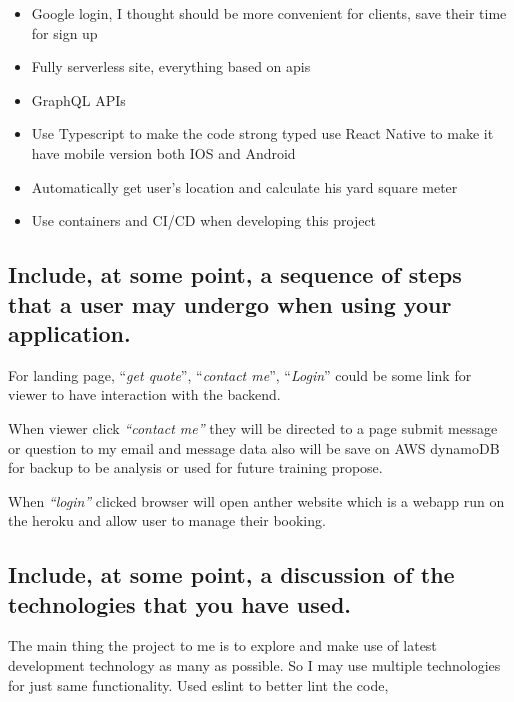 \documentclass[
  paper=a4,
  ,captions=tableheading
]{scrartcl}
\providecommand{\tightlist}{%
  \setlength{\itemsep}{0pt}\setlength{\parskip}{0pt}}
\begin{document}
\begin{itemize}
\tightlist
\item
  Google login, I thought should be more convenient for clients, save
  their time for sign up
\item
  Fully serverless site, everything based on apis
\item
  GraphQL APIs
\item
  Use Typescript to make the code strong typed use React Native to make
  it have mobile version both IOS and Android
\item
  Automatically get user's location and calculate his yard square meter
\item
  Use containers and CI/CD when developing this project
\end{itemize}

\hypertarget{include-at-some-point-a-sequence-of-steps-that-a-user-may-undergo-when-using-your-application.}{%
\subsection{Include, at some point, a sequence of steps that a user may
undergo when using your
application.}\label{include-at-some-point-a-sequence-of-steps-that-a-user-may-undergo-when-using-your-application.}}

For landing page, \enquote{\emph{get quote}}, \enquote{\emph{contact
me}}, \enquote{\emph{Login}} could be some link for viewer to have
interaction with the backend.

When viewer click \emph{\enquote{contact me}} they will be directed to a
page submit message or question to my email and message data also will
be save on AWS dynamoDB for backup to be analysis or used for future
training propose.

When \emph{\enquote{login}} clicked browser will open anther website
which is a webapp run on the heroku and allow user to manage their
booking.

\hypertarget{include-at-some-point-a-discussion-of-the-technologies-that-you-have-used.}{%
\subsection{Include, at some point, a discussion of the technologies
that you have
used.}\label{include-at-some-point-a-discussion-of-the-technologies-that-you-have-used.}}

The main thing the project to me is to explore and make use of latest
development technology as many as possible. So I may use multiple
technologies for just same functionality. Used eslint to better lint the
code,
\end{document}
